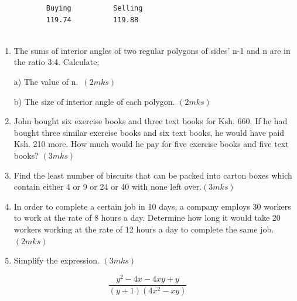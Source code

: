 \documentclass[
  a4paperpaper,
]{scrbook}
\begin{document}
\begin{tcolorbox}
\begin{verbatim}
           Buying          Selling
           119.74          119.88
              
\end{verbatim}

\begin{enumerate}
\def\labelenumi{\arabic{enumi}.}
\setcounter{enumi}{5}
\item
  The sums of interior angles of two regular polygons of sides' n-1 and
  n are in the ratio 3:4. Calculate;

  a) The value of n.~\((2mks)\)

  b) The size of interior angle of each polygon. \((2mks)\)
\item
  John bought six exercise books and three text books for Ksh. 660. If
  he had bought three similar exercise books and six text books, he
  would have paid Ksh. 210 more. How much would he pay for five exercise
  books and five text books? \((3mks)\)
\item
  Find the least number of biscuits that can be packed into carton boxes
  which contain either 4 or 9 or 24 or 40 with none left over.\((3mks)\)
\item
  In order to complete a certain job in 10 days, a company employs 30
  workers to work at the rate of 8 hours a day. Determine how long it
  would take 20 workers working at the rate of 12 hours a day to
  complete the same job. \((2mks)\)
\item
  Simplify the expression. \((3mks)\)
\end{enumerate}

\[\frac{y^2-4x-4xy+y}{(y+1)(4x^2-xy)}\]


\end{tcolorbox}
\end{document}
